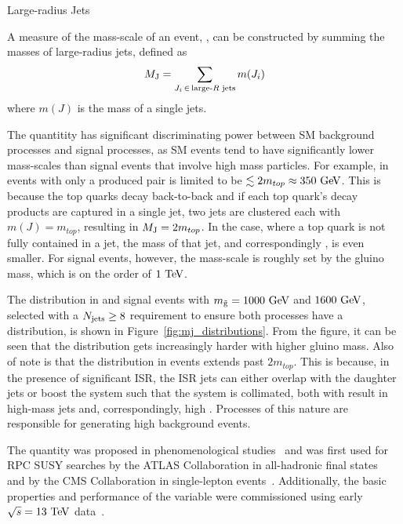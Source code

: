\begin{section}{Large-radius Jets}
\begin{subsection}{\MJ}
\label{subsec:MJ}

A measure of the mass-scale of an event, \MJ, can be constructed by summing the masses of large-radius jets, defined as
\begin{align}
M_{\mathrm{J}} = \sum_{J_{i}\, \in\, {\text{large-}R\text{ jets}}} m(J_i)
\end{align}
where $m(J)$ is the mass of a single \largeR jets.

The quantitity \MJ has significant discriminating power between SM background processes and signal processes, as SM events tend to have significantly lower mass-scales than signal events that involve high mass particles.
For example, \MJ in events with only a produced \ttbar pair is limited to be $\lesssim 2m_{top} \approx 350~\mathrm{Ge\kern -0.1em V}$.
This is because the top quarks decay back-to-back and if each top quark's decay products are captured in a single \largeR jet, two \largeR jets are clustered each with $m(J) = m_{top}$, resulting in $M_{\mathrm{J}} = 2m_{top}$.
In the case, where a top quark is not fully contained in a \largeR jet, the mass of that \largeR jet, and correspondingly \MJ, is even smaller.
For signal events, however, the mass-scale is roughly set by the gluino mass, which is on the order of $1~\mathrm{Te\kern -0.1em V}$.

The \MJ distribution in \ttbar and signal events with $m_{\tilde{\mathrm{g}}} = 1000~\mathrm{Ge\kern -0.1em V}$ and $1600~\mathrm{Ge\kern -0.1em V}$, selected with a $N_{\mathrm{jets}} \geq 8$ requirement to ensure both processes have a \Njets distribution, is shown in Figure~\ref{fig:mj_distributions}. 
From the figure, it can be seen that the \MJ distribution gets increasingly harder with higher gluino mass.
Also of note is that the \MJ distribution in \ttbar events extends past $2m_{top}$.
This is because, in the presence of significant ISR, the ISR jets can either overlap with the \ttbar daughter jets or boost the \ttbar system such that the system is collimated, both with result in high-mass \largeR jets and, correspondingly, high \MJ.
Processes of this nature are responsible for generating high \MJ background events.

The quantity \MJ was proposed in phenomenological studies~\cite{Hook:2012fd,Cohen:2012yc,Hedri:2013pvl} and was first used for RPC SUSY searches by the ATLAS Collaboration in all-hadronic final states~\cite{Aad:2015lea,Aad:2013wta} and by the CMS Collaboration in single-lepton events~\cite{Khachatryan:2016uwr,Sirunyan:2017fsj}.
Additionally, the basic properties and performance of the \MJ variable were commissioned using early $\sqrt{s} = 13~\mathrm{Te\kern -0.1em V}$ data~\cite{CMS-DP-2015-035}.


\end{subsection}
\end{section}
